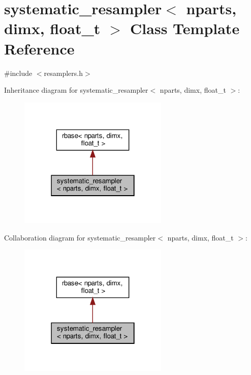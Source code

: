 \hypertarget{classsystematic__resampler}{}\section{systematic\+\_\+resampler$<$ nparts, dimx, float\+\_\+t $>$ Class Template Reference}
\label{classsystematic__resampler}


{\ttfamily \#include $<$resamplers.\+h$>$}



Inheritance diagram for systematic\+\_\+resampler$<$ nparts, dimx, float\+\_\+t $>$\+:\nopagebreak
\begin{figure}[H]
\begin{center}
\leavevmode
\includegraphics[width=202pt]{classsystematic__resampler__inherit__graph}
\end{center}
\end{figure}


Collaboration diagram for systematic\+\_\+resampler$<$ nparts, dimx, float\+\_\+t $>$\+:\nopagebreak
\begin{figure}[H]
\begin{center}
\leavevmode
\includegraphics[width=202pt]{classsystematic__resampler__coll__graph}
\end{center}
\end{figure}
